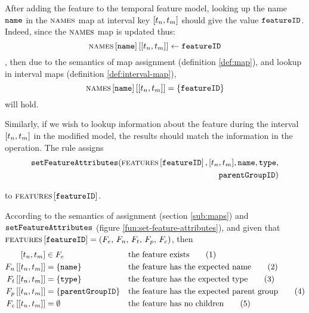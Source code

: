 After adding the feature to the temporal feature model, looking up the name $\texttt{name}$ in the $\textsc{names}{}$ map at interval key $\interval{t_n}{t_m}$ should give the value $\texttt{featureID}$. Indeed, since the $\textsc{names}{}$ map is updated thus:
\[
   \lookup{\lookup{\names}{\var{name}}}{\interval{t_n}{t_m}} \assign \var{featureID}
\]
, then due to the semantics of map assignment (definition \vref{def:map}), and lookup in interval maps (definition \vref{def:interval-map}),
\[
   \lookup{\lookup{\names}{\var{name}}}{\interval{t_n}{t_m}} = \set{\var{featureID}}
\]
will hold.

Similarly, if we wish to lookup information about the feature during the interval $\interval{t_n}{t_m}$ in the modified model, the results should match the information in the operation. The rule assigns 
\begin{equation*}
   \begin{split}
   \var{setFeatureAttributes}(\lookup{\features{}}{\var{featureID}}, \interval{t_n}{t_m}, \var{name}, \var{type}, \\
   \var{parentGroupID})
   \end{split}
\end{equation*}

to $\textsc{features} \left[ \texttt{featureID} \right]$. 

According to the semantics of assignment (section \vref{sub:maps}) and $\texttt{setFeatureAttributes}$ (figure \vref{fun:set-feature-attributes}), and given that $\textsc{features} \left[ \texttt{featureID} \right] = \left(F_e,\, F_n,\, F_t,\, F_p,\, F_c\right)$, then 
\begin{align}
   \interval{t_n}{t_m} &\in F_e && \text{the feature exists} \tag{1} \label{add-feature1}\\
   \lookup{F_n}{\interval{t_n}{t_m}} &= \set{\var{name}} && \text{the feature has the expected name} \tag{2} \label{add-feature2}\\
   \lookup{F_t}{\interval{t_n}{t_m}} &= \set{\var{type}}  && \text{the feature has the expected type} \tag{3} \label{add-feature3}\\
   \lookup{F_p}{\interval{t_n}{t_m}} &= \set{\var{parentGroupID}}  && \text{the feature has the expected parent group} \tag{4} \label{add-feature4}\\
   \lookup{F_c}{\interval{t_n}{t_m}} &= \emptyset && \text{the feature has no children} \tag{5} \label{add-feature5}
\end{align}

